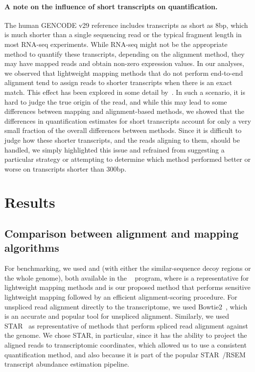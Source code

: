 \paragraph{A note on the influence of short transcripts on quantification.} 
The human GENCODE v29 reference includes transcripts as short as 8bp, which is
much shorter than a single sequencing read or the typical fragment length in
most RNA-seq experiments. While RNA-seq might not be the appropriate method to
quantify these transcripts, depending on the alignment method, they may have
mapped reads and obtain non-zero expression values. In our analyses, we observed
that lightweight mapping methods that do not perform end-to-end alignment tend
to assign reads to shorter transcripts when there is an exact match. This effect
has been explored in some detail by~\citet{wu2018limitations}. In such a
scenario, it is hard to judge the true origin of the read, and while this may
lead to some differences between mapping and alignment-based methods, we showed that the
differences in quantification estimates for short transcripts account for only a
very small fraction of the overall differences between methods. 
Since it is difficult to judge how these shorter transcripts, and the
reads aligning to them, should be handled, we simply highlighted this issue and
refrained from suggesting a particular strategy or attempting to determine which
method performed better or worse on transcripts shorter than $300$bp. 

\section{Results}
\subsection{Comparison between alignment and mapping algorithms}
\label{subsec:overview}

For benchmarking, we used \qm and \hsa (with either the similar-sequence decoy regions or the whole genome), 
both available in the \salmon~\citep{salmon} program, where
\qm is a representative for lightweight mapping methods and \hsa is our proposed
method that performs sensitive lightweight mapping
followed by an efficient alignment-scoring procedure. For unspliced read
alignment directly to the transcriptome, we used Bowtie2~\citep{bowtie2}, which
is an accurate and popular tool for unspliced alignment. Similarly, we used
STAR~\citep{star} as representative of methods that perform spliced read
alignment against the genome. We chose STAR, in particular, since it has the
ability to project the aligned reads to transcriptomic coordinates, which allowed
us to use a consistent quantification method, and also because it is part of the
popular STAR~\citep{star}/RSEM~\citep{li2011rsem} transcript abundance estimation
pipeline.

